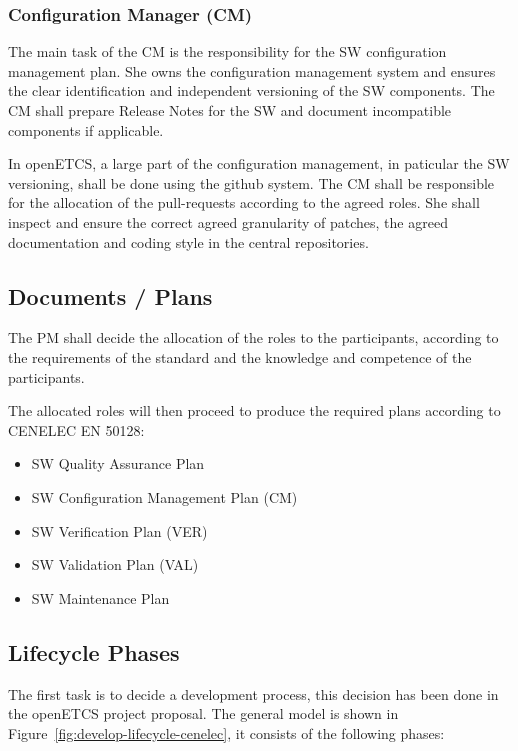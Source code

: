 \subsubsection{Configuration Manager (CM)}
\label{sec:conf-manag}

The main task of the CM is the responsibility for the SW configuration
management plan. She owns the configuration management system and ensures the
clear identification and independent versioning of the SW components. The CM
shall prepare Release Notes for the SW and document incompatible components if
applicable.

In openETCS, a large part of the configuration management, in paticular the SW
versioning, shall be done using the github system. The CM shall be responsible
for the allocation of the pull-requests according to the agreed roles. She shall
inspect and ensure the correct agreed granularity of patches, the agreed
documentation and coding style in the central repositories.


\subsection{Documents / Plans}
\label{sec:documents--plan}

The PM shall decide the allocation of the roles to the participants, according
to the requirements of the standard and the knowledge and competence of the
participants.

The allocated roles will then proceed to produce the required plans according to
CENELEC EN 50128:

\begin{itemize}
\item SW Quality Assurance Plan
\item SW Configuration Management Plan (CM)
\item SW Verification Plan (VER)
\item SW Validation Plan (VAL)
\item SW Maintenance Plan
\end{itemize}



\subsection{Lifecycle Phases}
\label{sec:lifecycle-phases}

The first task is to decide a development process, this decision has been done
in the openETCS project proposal. The general model is shown in
Figure~\ref{fig:develop-lifecycle-cenelec}, it consists of the following phases:

